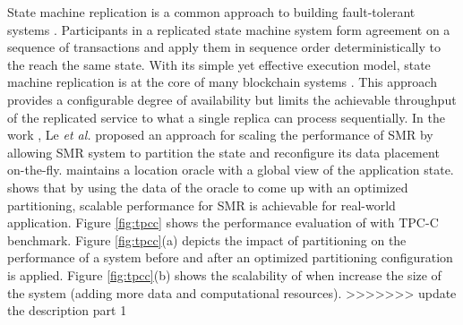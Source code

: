 State machine replication is a common approach to building fault-tolerant
systems \cite{Lam78, Sch90}. Participants in a replicated state machine system
form agreement on a sequence of transactions and apply them in sequence order
deterministically to the reach the same state. With its simple yet effective
execution model, state machine replication is at the core of many blockchain
systems \cite{baudet2019state, cachin2016architecture}. This approach provides a
configurable degree of availability but limits the achievable throughput of the
replicated service to what a single replica can process sequentially. In the
work \dynastar \cite{le2019dynastar}, Le \emph{et al.} proposed an approach for
scaling the performance of SMR by allowing SMR system to partition the state and
reconfigure its data placement on-the-fly. \dynastar maintains a location oracle
with a global view of the application state. \dynastar shows that by using the
data of the oracle to come up with an optimized partitioning, scalable
performance for SMR is achievable for real-world application. Figure
\ref{fig:tpcc} shows the performance evaluation of \dynastar with TPC-C
benchmark. Figure \ref{fig:tpcc}(a) depicts the impact of partitioning on the
performance of a system before and after an optimized partitioning configuration
is applied. Figure \ref{fig:tpcc}(b) shows the scalability of \dynastar when
increase the size of the system (adding more data and computational resources). 
>>>>>>> update the description part 1

